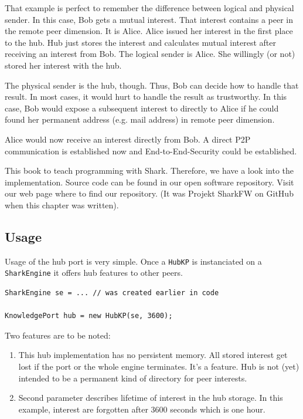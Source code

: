 {That example is perfect to remember the difference between logical and physical sender. In this case, Bob gets a mutual interest. That interest contains a peer in the remote peer dimension. It is Alice. Alice issued her interest in the first place to the hub. Hub just stores the interest and calculates mutual interest after receiving an interest from Bob. The logical sender is Alice. She willingly (or not) stored her interest with the hub.

The physical sender is the hub, though. Thus, Bob can decide how to handle that result. In most cases, it would hurt to handle the result as trustworthy. In this case, Bob would expose a subsequent interest to directly to Alice if he could found her permanent address (e.g. mail address) in remote peer dimension.

Alice would now receive an interest directly from Bob. A direct P2P communication is established now and End-to-End-Security could be established.

This book to teach programming with Shark. Therefore, we have a look into the implementation. Source code can be found in our open software repository. Visit our web page where to find our repository. (It was Projekt SharkFW on GitHub when this chapter was written).

\subsection{Usage}
Usage of the hub port is very simple. Once a {\tt HubKP} is instanciated on a {\tt SharkEngine} it offers hub features to other peers.

\begin{verbatim}
SharkEngine se = ... // was created earlier in code

KnowledgePort hub = new HubKP(se, 3600);
\end{verbatim}

Two features are to be noted:

\begin{enumerate}
\item
This hub implementation has no persistent memory. All stored interest get lost if the port or the whole engine terminates. It's a feature. Hub is not (yet) intended to be a permanent kind of directory for peer interests.
\item
Second parameter describes lifetime of interest in the hub storage. In this example, interest are forgotten after 3600 seconds which is one hour.
\end{enumerate}

}
